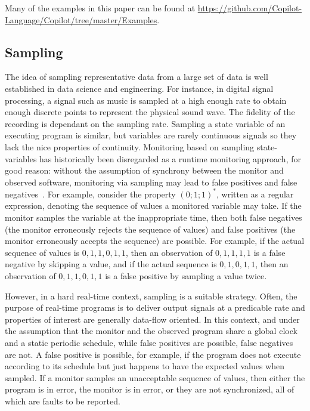 Many of the examples in this paper can be found at
\url{https://github.com/Copilot-Language/Copilot/tree/master/Examples}.

\subsection{Sampling} \label{sampling}
The idea of sampling representative data from a large set of data  is well
established in data science and engineering. For instance, in digital
signal processing, a signal such as music is sampled at a high enough
rate to obtain enough discrete points to represent the physical sound
wave. The fidelity of the recording is dependant on the sampling
rate. Sampling a state variable of an executing program is similar,
but variables are rarely continuous signals so they lack the nice
properties of continuity.
Monitoring based on sampling state-variables has historically been disregarded
as a runtime monitoring approach, for good reason: without the assumption of
synchrony between the monitor and observed software, monitoring via sampling may
lead to false positives and false negatives~\cite{DwyerDE08}.  For example,
consider the property $(0;1;1)^*$, written as a regular expression, denoting the
sequence of values a monitored variable may take.  If the monitor samples the
variable at the inappropriate time, then both false negatives (the monitor
erroneously rejects the sequence of values) and false positives (the monitor
erroneously accepts the sequence) are possible.  For example, if the actual
sequence of values is $0,1,1,0,1,1$, then an observation of $0,1,1,1,1$ is a
false negative by skipping a value, and if the actual sequence is $0,1,0,1,1$,
then an observation of $0,1,1,0,1,1$ is a false positive by sampling a value
twice.



However, in a hard real-time context, sampling is a suitable strategy.  Often,
the purpose of real-time programs is to deliver output signals at a predicable
rate and properties of interest are generally data-flow oriented.  In this
context, and under the assumption that the monitor and the observed program
share a global clock and a static periodic schedule, while false positives are
possible, false negatives are not.  A false positive is possible, for example,
if the program does not execute according to its schedule but just happens to
have the expected values when sampled.  If a monitor samples an unacceptable
sequence of values, then either the program is in error, the monitor is in
error, or they are not synchronized, all of which are faults to be reported.


